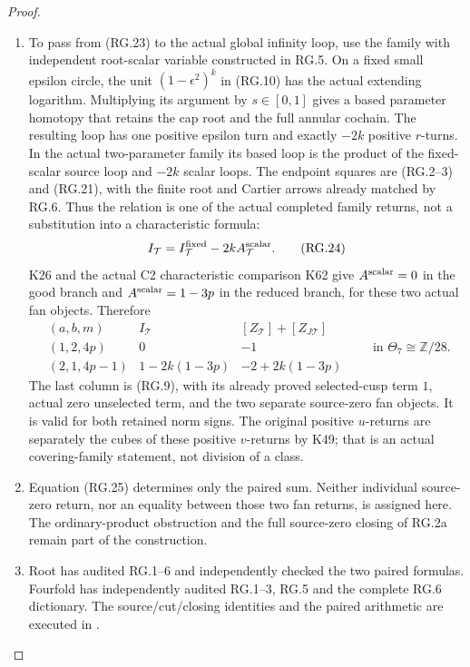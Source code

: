 \begin{proof}
\begin{enumerate}[label=\arabic*.]
\item To pass from (RG.23) to the actual global infinity loop,
use the family with independent root-scalar variable
constructed in RG.5. On a fixed small epsilon circle,
the unit \((1-\epsilon^2)^k\) in (RG.10) has the actual
extending logarithm. Multiplying its argument by
\(s\in[0,1]\) gives a based parameter homotopy that
retains the cap root and the full annular cochain.
The resulting loop has one positive epsilon turn and
exactly \(-2k\) positive \(r\)-turns. In the actual
two-parameter family its based loop is the product of
the fixed-scalar source loop and \(-2k\) scalar loops.
The endpoint squares are (RG.2--3) and (RG.21), with
the finite root and Cartier arrows already matched
by RG.6. Thus the relation is one of the actual
completed family returns, not a substitution into a
characteristic formula:
\[
             I_{\mathcal T}
                  =I^{\rm fixed}_{\mathcal T}
                         -2kA^{\rm scalar}_{\mathcal T}.
                                                        \tag{RG.24}
\]
K26 and the actual C2 characteristic comparison K62 give
\(A^{\rm scalar}=0\) in the good branch
and \(A^{\rm scalar}=1-3p\) in the reduced branch,
for these two actual fan objects. Therefore
\[
 \begin{array}{c|c|c}
 (a,b,m)&I_{\mathcal T}
                 &[Z_{\mathcal T}]+[Z_{J\mathcal T}]\\ \hline
 (1,2,4p)&0&-1\\
 (2,1,4p-1)&1-2k(1-3p)&-2+2k(1-3p)
 \end{array}
 \qquad\text{in }\Theta_7\cong\mathbb Z/28.             \tag{RG.25}
\]
The last column is (RG.9), with its already proved
selected-cusp term \(1\), actual zero unselected
term, and the two separate source-zero fan objects.
It is valid for both retained norm signs. The original
positive \(u\)-returns are separately the cubes of
these positive \(v\)-returns by K49; that is an actual
covering-family statement, not division of a class.

\item Equation (RG.25) determines only the paired sum.
Neither individual source-zero return, nor an equality
between those two fan returns, is assigned here.
The ordinary-product obstruction and the full
source-zero closing of RG.2a remain part of the
construction.

\item Root has audited RG.1--6 and independently checked
the two paired formulas. Fourfold has independently
audited RG.1--3, RG.5 and the complete RG.6 dictionary.
The source/cut/closing identities and the paired
arithmetic are executed in
.

\end{enumerate}
\end{proof}